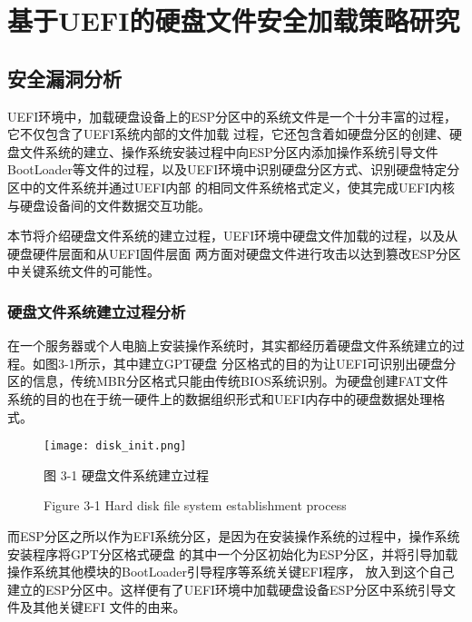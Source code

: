 %
%
\chapter{基于UEFI的硬盘文件安全加载策略研究}
\label{cha:architecture}

%
%
\section{安全漏洞分析}
UEFI环境中，加载硬盘设备上的ESP分区中的系统文件是一个十分丰富的过程，它不仅包含了UEFI系统内部的文件加载
过程，它还包含着如硬盘分区的创建、硬盘文件系统的建立、操作系统安装过程中向ESP分区内添加操作系统引导文件
BootLoader等文件的过程，以及UEFI环境中识别硬盘分区方式、识别硬盘特定分区中的文件系统并通过UEFI内部
的相同文件系统格式定义，使其完成UEFI内核与硬盘设备间的文件数据交互功能。
\par 本节将介绍硬盘文件系统的建立过程，UEFI环境中硬盘文件加载的过程，以及从硬盘硬件层面和从UEFI固件层面
两方面对硬盘文件进行攻击以达到篡改ESP分区中关键系统文件的可能性。
\subsection{硬盘文件系统建立过程分析}
在一个服务器或个人电脑上安装操作系统时，其实都经历着硬盘文件系统建立的过程。如图3-1所示，其中建立GPT硬盘
分区格式的目的为让UEFI可识别出硬盘分区的信息，传统MBR分区格式只能由传统BIOS系统识别。为硬盘创建FAT文件
系统的目的也在于统一硬件上的数据组织形式和UEFI内存中的硬盘数据处理格式。

\begin{figure}[htb]
    \label{ffs_format}
    \vspace{0cm}   
    \setlength{\abovecaptionskip}{0.3cm}  
	\centering
    \texttt{[image: disk\_init.png]}
    \caption*{图 3-1 硬盘文件系统建立过程}
    \setlength{\belowcaptionskip}{-0.7cm}
    \caption*{Figure 3-1 Hard disk file system establishment process}
\end{figure}

而ESP分区之所以作为EFI系统分区，是因为在安装操作系统的过程中，操作系统安装程序将GPT分区格式硬盘
的其中一个分区初始化为ESP分区，并将引导加载操作系统其他模块的BootLoader引导程序等系统关键EFI程序，
放入到这个自己建立的ESP分区中。这样便有了UEFI环境中加载硬盘设备ESP分区中系统引导文件及其他关键EFI
文件的由来。

